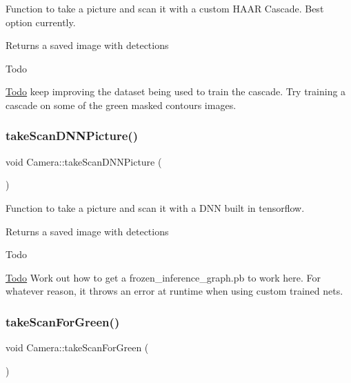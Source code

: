Function to take a picture and scan it with a custom H\+A\+AR Cascade. Best option currently.

\begin{DoxyReturn}{Returns}
a saved image with detections
\end{DoxyReturn}
\begin{DoxyRefDesc}{Todo}
\item[\hyperlink{todo__todo000003}{Todo}]keep improving the dataset being used to train the cascade. Try training a cascade on some of the green masked contours images. \end{DoxyRefDesc}
\mbox{\label{classCamera_a59f08842d3de300419c74b12bee44d47}} 
\subsubsection{\texorpdfstring{take\+Scan\+D\+N\+N\+Picture()}{takeScanDNNPicture()}}
{\footnotesize\ttfamily void Camera\+::take\+Scan\+D\+N\+N\+Picture (\begin{DoxyParamCaption}{ }\end{DoxyParamCaption})}

Function to take a picture and scan it with a D\+NN built in tensorflow.

\begin{DoxyReturn}{Returns}
a saved image with detections
\end{DoxyReturn}
\begin{DoxyRefDesc}{Todo}
\item[\hyperlink{todo__todo000002}{Todo}]Work out how to get a frozen\+\_\+inference\+\_\+graph.\+pb to work here. For whatever reason, it throws an error at runtime when using custom trained nets. \end{DoxyRefDesc}
\mbox{\label{classCamera_ab4f4c3f77479c8594dfa7fd7e6348306}} 
\subsubsection{\texorpdfstring{take\+Scan\+For\+Green()}{takeScanForGreen()}}
{\footnotesize\ttfamily void Camera\+::take\+Scan\+For\+Green (\begin{DoxyParamCaption}{ }\end{DoxyParamCaption})}

